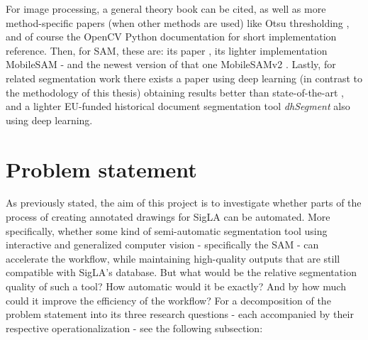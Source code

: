 For image processing, a general theory book \parencite{DigitalImageProcessing} can be cited, as well as more method-specific papers (when other methods are used) like Otsu thresholding \parencite{Otsu1979}, and of course the OpenCV Python documentation \parencite{opencv_imgproc_docs} for short implementation reference.
Then, for \acs{SAM}, these are: its paper \parencite{sam}, its lighter implementation MobileSAM \parencite{mobile_sam} - and the newest version of that one MobileSAMv2 \parencite{mobile_sam_v2}.
Lastly, for related segmentation work there exists a paper using deep learning (in contrast to the methodology of this thesis) obtaining results better than state-of-the-art \parencite{DeepLearningSegmentation}, and a lighter EU-funded historical document segmentation tool \textit{dhSegment} \parencite{dhsegment} also using deep learning.


\section{Problem statement}
As previously stated, the aim of this project is to investigate whether parts of the process of creating annotated drawings for SigLA can be automated.
More specifically, whether some kind of semi-automatic segmentation tool using interactive and generalized computer vision - specifically the \acf{SAM} - can accelerate the workflow, while maintaining high-quality outputs that are still compatible with SigLA’s database.
But what would be the relative segmentation quality of such a tool? How automatic would it be exactly? And by how much could it improve the efficiency of the workflow?
For a decomposition of the problem statement into its three research questions - each accompanied by their respective operationalization - see the following subsection:

